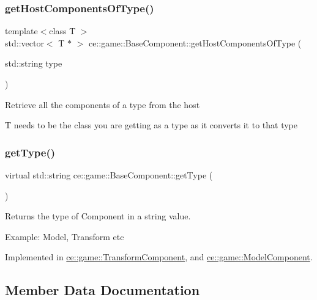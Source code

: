 \subsubsection{\texorpdfstring{get\+Host\+Components\+Of\+Type()}{getHostComponentsOfType()}}
{\footnotesize\ttfamily template$<$class T $>$ \\
std\+::vector$<$ T $\ast$ $>$ ce\+::game\+::\+Base\+Component\+::get\+Host\+Components\+Of\+Type (\begin{DoxyParamCaption}\item[{std\+::string}]{type }\end{DoxyParamCaption})\hspace{0.3cm}{\ttfamily [inline]}}

Retrieve all the components of a type from the host

T needs to be the class you are getting as a type as it converts it to that type \mbox{\label{classce_1_1game_1_1_base_component_a1022b55c1926a019a2b3a71fb6b9150e}} 
\subsubsection{\texorpdfstring{get\+Type()}{getType()}}
{\footnotesize\ttfamily virtual std\+::string ce\+::game\+::\+Base\+Component\+::get\+Type (\begin{DoxyParamCaption}{ }\end{DoxyParamCaption})\hspace{0.3cm}{\ttfamily [pure virtual]}}



Returns the type of Component in a string value. 

Example\+: Model, Transform etc 

Implemented in \hyperlink{classce_1_1game_1_1_transform_component_ae4a2729b3f88a77b8405de317ab03510}{ce\+::game\+::\+Transform\+Component}, and \hyperlink{classce_1_1game_1_1_model_component_aaac15cad336e35df7be55dda34f53643}{ce\+::game\+::\+Model\+Component}.



\subsection{Member Data Documentation}
\mbox{\label{classce_1_1game_1_1_base_component_ad0448e0b4026fbfee1f88b63ccfbd19c}} 
